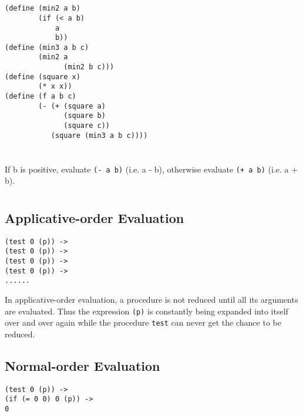 \documentclass[a4paper]{report}
\begin{document}

\section{}

\begin{lstlisting}
(define (min2 a b)
        (if (< a b)
            a
            b))
(define (min3 a b c)
        (min2 a
              (min2 b c)))
(define (square x)
        (* x x))
(define (f a b c)
        (- (+ (square a)
              (square b)
              (square c))
           (square (min3 a b c))))
\end{lstlisting}


\section{}

If b is positive, evaluate \lstinline{(- a b)} (i.e. a - b), otherwise evaluate \lstinline{(+ a b)} (i.e. a + b).


\section{}

\subsection*{Applicative-order Evaluation}

\begin{lstlisting}
(test 0 (p)) ->
(test 0 (p)) ->
(test 0 (p)) ->
(test 0 (p)) ->
......
\end{lstlisting}

In applicative-order evaluation, a procedure is not reduced until all its arguments are evaluated. Thus the expression \lstinline{(p)} is constantly being expanded into itself over and over again while the procedure \lstinline{test} can never get the chance to be reduced.

\subsection*{Normal-order Evaluation}

\begin{lstlisting}
(test 0 (p)) ->
(if (= 0 0) 0 (p)) ->
0
\end{lstlisting}
\end{document}

